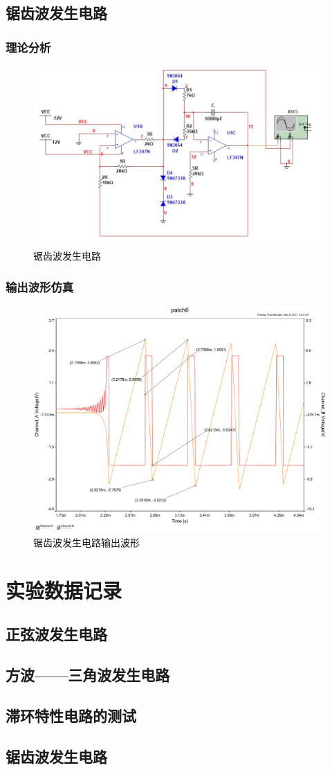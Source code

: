 \documentclass[UTF8,a4paper]{paper}
\begin{document}
\subsection{锯齿波发生电路}
\subsubsection{理论分析}
\begin {figure}[H]
\includegraphics [width=\textwidth]{tan.jpg}
\caption{锯齿波发生电路}
\label{tanCrit}
\end {figure}
\subsubsection{输出波形仿真}
\begin{figure}[H]
\centering
\includegraphics[width=\textwidth]{tan.pdf}
\caption{锯齿波发生电路输出波形}
\label{BI}
\end{figure}
\section{实验数据记录}
\subsection{正弦波发生电路}
\subsection{方波——三角波发生电路}
\subsection{滞环特性电路的测试}
\subsection{锯齿波发生电路}
\end{document}

